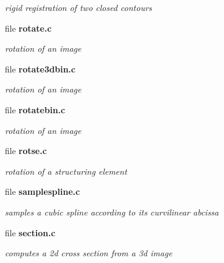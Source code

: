 \begin{DoxyCompactItemize}
\begin{DoxyCompactList}\small\item\em rigid registration of two closed contours \item\end{DoxyCompactList}

\item 
file {\bf rotate.c}


\begin{DoxyCompactList}\small\item\em rotation of an image \item\end{DoxyCompactList}

\item 
file {\bf rotate3dbin.c}


\begin{DoxyCompactList}\small\item\em rotation of an image \item\end{DoxyCompactList}

\item 
file {\bf rotatebin.c}


\begin{DoxyCompactList}\small\item\em rotation of an image \item\end{DoxyCompactList}

\item 
file {\bf rotse.c}


\begin{DoxyCompactList}\small\item\em rotation of a structuring element \item\end{DoxyCompactList}

\item 
file {\bf samplespline.c}


\begin{DoxyCompactList}\small\item\em samples a cubic spline according to its curvilinear abcissa \item\end{DoxyCompactList}

\item 
file {\bf section.c}


\begin{DoxyCompactList}\small\item\em computes a 2d cross section from a 3d image \item\end{DoxyCompactList}


\end{DoxyCompactItemize}
